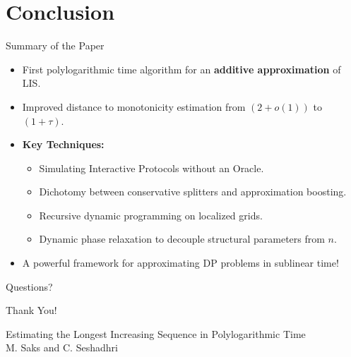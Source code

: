 \documentclass[11pt,aspectratio=169]{beamer}
\begin{document}
\section{Conclusion}

\begin{frame}{Summary of the Paper}
    \begin{itemize}
        \item First polylogarithmic time algorithm for an \textbf{additive approximation} of LIS.
        \item Improved distance to monotonicity estimation from $(2+o(1))$ to $(1+\tau)$.
        \item \textbf{Key Techniques:}
        \begin{itemize}
            \item Simulating Interactive Protocols without an Oracle.
            \item Dichotomy between conservative splitters and approximation boosting.
            \item Recursive dynamic programming on localized grids.
            \item Dynamic phase relaxation to decouple structural parameters from $n$.
        \end{itemize}
        \item A powerful framework for approximating DP problems in sublinear time!
    \end{itemize}
\end{frame}

\begin{frame}{Questions?}
    \begin{center}
        \Huge Thank You!
    \end{center}
    \vspace{1cm}
    \begin{center}
        Estimating the Longest Increasing Sequence in Polylogarithmic Time \\
        M. Saks and C. Seshadhri
    \end{center}
\end{frame}
\end{document}
